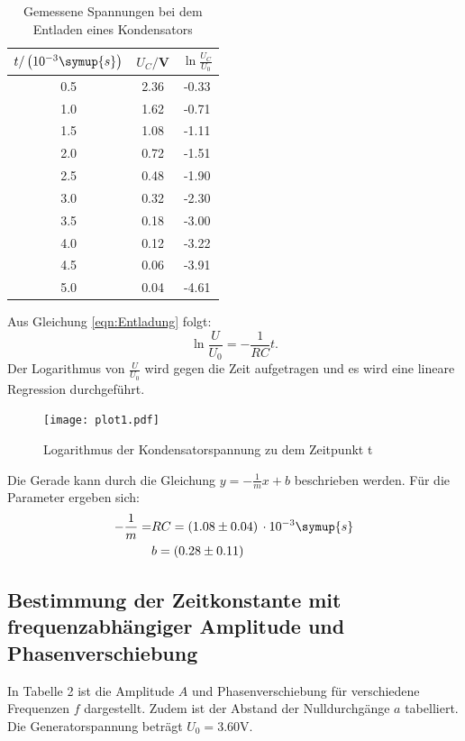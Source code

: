 \begin{table}[H]
  \centering
  \caption{Gemessene Spannungen bei dem Entladen eines Kondensators}
  \label{tab:Rechteckspannung}
  \begin{tabular}{c c c}
    \toprule
    $t/\left(10^{-3}\symup{s}\right)$ & $U_C/$V & $\ln{\frac{U_C}{U_0}}$ \\
    \midrule
    0.5 & 2.36 & -0.33 \\
    1.0 & 1.62 & -0.71 \\
    1.5 & 1.08 & -1.11 \\
    2.0 & 0.72 & -1.51 \\
    2.5 & 0.48 & -1.90 \\
    3.0 & 0.32 & -2.30 \\
    3.5 & 0.18 & -3.00 \\
    4.0 & 0.12 & -3.22 \\
    4.5 & 0.06 & -3.91 \\
    5.0 & 0.04 & -4.61 \\
    \bottomrule
  \end{tabular}
\end{table}

Aus Gleichung \eqref{eqn:Entladung} folgt:
\begin{equation}
  \ln{\frac{U}{U_0}} = -\frac{1}{RC}t.
\end{equation}
Der Logarithmus von $\frac{U}{U_0}$ wird gegen die Zeit aufgetragen und es wird eine lineare Regression durchgeführt.



\begin{figure}[H]
  \centering
  \texttt{[image: plot1.pdf]}
  \caption{Logarithmus der Kondensatorspannung zu dem Zeitpunkt t}
  \label{fig:entladung}
\end{figure}

Die Gerade kann durch die Gleichung $y = -\frac{1}{m}x + b$ beschrieben werden. Für die Parameter ergeben sich:
\begin{align*}
  -\frac{1}{m} = &RC = (1.08 \pm 0.04) \, \cdot 10^{-3} \symup{s} \\
  &b = (0.28 \pm 0.11)
\end{align*}

\subsection{Bestimmung der Zeitkonstante mit frequenzabhängiger Amplitude und Phasenverschiebung}

In Tabelle 2 ist die Amplitude $A$ und Phasenverschiebung für verschiedene Frequenzen $f$ dargestellt. Zudem ist der
Abstand der Nulldurchgänge $a$ tabelliert. Die Generatorspannung beträgt $U_0 = 3.60$V.

